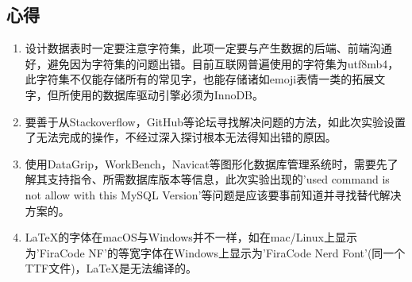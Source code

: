 \documentclass[a4paper,UTF8,heading=false,12pt]{article}
\begin{document}
\subsection{心得}

\begin{enumerate}
    \item 设计数据表时一定要注意字符集，此项一定要与产生数据的后端、前端沟通好，避免因为字符集的问题出错。目前互联网普遍使用的字符集为utf8mb4，此字符集不仅能存储所有的常见字，也能存储诸如emoji表情一类的拓展文字，但所使用的数据库驱动引擎必须为InnoDB。
    \item 要善于从Stackoverflow，GitHub等论坛寻找解决问题的方法，如此次实验设置了无法完成的操作，不经过深入探讨根本无法得知出错的原因。
    \item 使用DataGrip，WorkBench，Navicat等图形化数据库管理系统时，需要先了解其支持指令、所需数据库版本等信息，此次实验出现的'used command is not allow with this MySQL Version'等问题是应该要事前知道并寻找替代解决方案的。
    \item \LaTeX 的字体在macOS与Windows并不一样，如在mac/Linux上显示为'FiraCode NF'的等宽字体在Windows上显示为'FiraCode Nerd Font'(同一个TTF文件)，\LaTeX 是无法编译的。
\end{enumerate}


\end{document}
